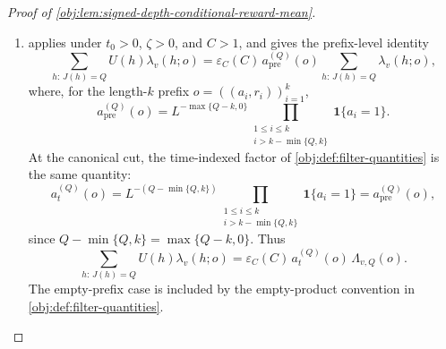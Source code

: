 \documentclass[11pt]{article}
\begin{document}
\begin{proof}[Proof of \cref{obj:lem:signed-depth-conditional-reward-mean}]
\begin{enumerate}
For fixed \(h\) and \(a\), the displayed one-step formula factors \(\mathfrak m_v(r,h'\mid h,a)\) into the reward weight and a hidden-transition probability. Hence
\[
\sum_{h'}\mathfrak m_v(r,h'\mid h,a)
=
\frac{1+\phi(r)\sigma(v)c_0(t_0)U(h)\mathbf 1\{J(h)=Q\}}{2}.
\]
Using \(\sum_a\pi_\zeta(a)=1\), \(\sum_r\phi(r)/2=0\), and \(\sum_r\phi(r)^2/2=1\), the inner one-step payoff is
\[
\begin{aligned}
\sum_{a}\pi_\zeta(a)
\sum_{r}\phi(r)
\sum_{h'}\mathfrak m_v(r,h'\mid h,a)
&=
\sum_a\pi_\zeta(a)
\sum_r \phi(r)
\frac{1+\phi(r)\sigma(v)c_0(t_0)U(h)\mathbf 1\{J(h)=Q\}}{2} \\
&=
\sigma(v)c_0(t_0)U(h)\mathbf 1\{J(h)=Q\}.
\end{aligned}
\]
Therefore
\[
\begin{aligned}
N_v(o)
&=
\sigma(v)c_0(t_0)
\sum_{\eta}\Omega_v(\eta;o)U(h_k)\mathbf 1\{J(h_k)=Q\} \\
&=
\sigma(v)c_0(t_0)
\sum_{h:\,J(h)=Q}U(h)\lambda_v(h;o).
\end{aligned}
\]
This is the numerator identity supplied by \cref{obj:lem:signed-depth-next-reward-numerator}; the displayed derivation records the finite-trajectory regrouping used at the canonical cut. The denominator and the terminal-depth quotient are identified below.

\item
{} applies under \(t_0>0\), \(\zeta>0\), and \(C>1\), and gives the prefix-level identity
\[
\sum_{h:\,J(h)=Q}U(h)\lambda_v(h;o)
=
\varepsilon_C(C)\,a_{\mathrm{pre}}^{(Q)}(o)
\sum_{h:\,J(h)=Q}\lambda_v(h;o),
\]
where, for the length-\(k\) prefix \(o=((a_i,r_i))_{i=1}^k\),
\[
a_{\mathrm{pre}}^{(Q)}(o)
=
L^{-\max\{Q-k,0\}}
\prod_{\substack{1\le i\le k\\ i>k-\min\{Q,k\}}}
\mathbf 1\{a_i=1\}.
\]
At the canonical cut, the time-indexed factor of \cref{obj:def:filter-quantities} is the same quantity:
\[
a_t^{(Q)}(o)
=
L^{-(Q-\min\{Q,k\})}
\prod_{\substack{1\le i\le k\\ i>k-\min\{Q,k\}}}
\mathbf 1\{a_i=1\}
=
a_{\mathrm{pre}}^{(Q)}(o),
\]
since \(Q-\min\{Q,k\}=\max\{Q-k,0\}\). Thus
\[
\sum_{h:\,J(h)=Q}U(h)\lambda_v(h;o)
=
\varepsilon_C(C)\,a_t^{(Q)}(o)\,\Lambda_{v,Q}(o).
\]
The empty-prefix case is included by the empty-product convention in \cref{obj:def:filter-quantities}. %


\end{enumerate}
\end{proof}
\end{document}
